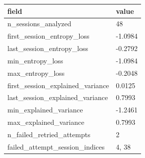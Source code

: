 \begin{tabular}{ll}
\hline
field & value \\
\hline
n\_sessions\_analyzed & 48 \\
first\_session\_entropy\_loss & -1.0984 \\
last\_session\_entropy\_loss & -0.2792 \\
min\_entropy\_loss & -1.0984 \\
max\_entropy\_loss & -0.2048 \\
first\_session\_explained\_variance & 0.0125 \\
last\_session\_explained\_variance & 0.7993 \\
min\_explained\_variance & -1.2461 \\
max\_explained\_variance & 0.7993 \\
n\_failed\_retried\_attempts & 2 \\
failed\_attempt\_session\_indices & 4, 38 \\
\hline
\end{tabular}
